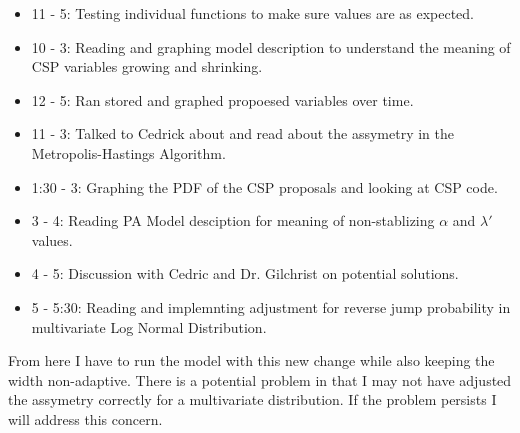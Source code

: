 \documentclass[12pt,hyperref]{labbook}
\begin{document}
\begin{itemize}
    \item 11 - 5: Testing individual functions to make sure values are as expected.
\end{itemize}
\begin{itemize}
    \item 10 - 3: Reading and graphing model description to understand the meaning of CSP variables growing and shrinking.
\end{itemize}
\begin{itemize}
    \item 12 - 5: Ran stored and graphed propoesed variables over time.
\end{itemize}
\begin{itemize}
        \item 11 - 3: Talked to Cedrick about and read about the assymetry in the Metropolis-Hastings Algorithm.
\end{itemize}
\begin{itemize}
 \item 1:30 - 3: Graphing the PDF of the CSP proposals and looking at CSP code.
 \item 3 - 4: Reading PA Model desciption for meaning of non-stablizing $\alpha$ and $\lambda'$ values.
 \item 4 - 5: Discussion with Cedric and Dr. Gilchrist on potential solutions.
 \item 5 - 5:30: Reading and implemnting adjustment for reverse jump probability in multivariate Log Normal Distribution.
\end{itemize}
From here I have to run the model with this new change while also keeping the width non-adaptive. There is a potential problem
in that I may not have adjusted the assymetry correctly for a multivariate distribution. If the problem persists I will address
this concern.
\end{document}
